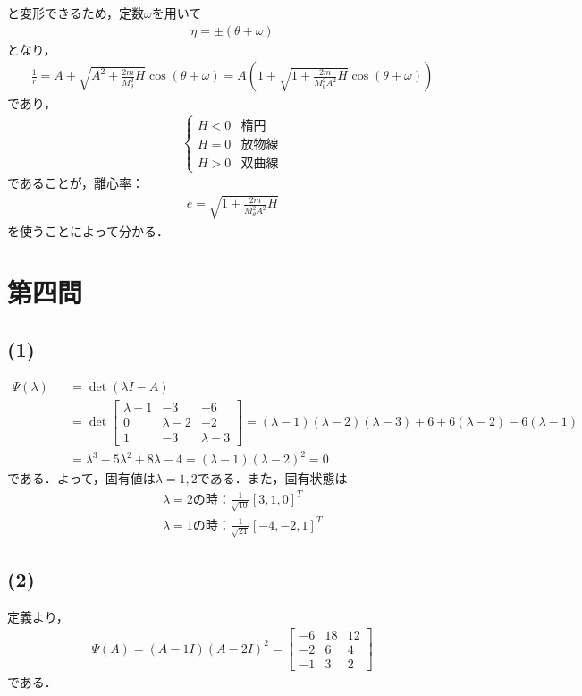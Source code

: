 \documentclass[12pt,dvipdfmx]{jsarticle}
\begin{document}
と変形できるため，定数$\omega$を用いて
\begin{eqnarray}
  \eta = \pm(\theta +\omega)
\end{eqnarray}
となり，
\begin{eqnarray}
  \frac{1}{r} = A + \sqrt{ A^2 + \frac{2m}{M_\theta^2} H }\cos(\theta +\omega) = A\left( 1 + \sqrt{ 1 + \frac{2m}{M_\theta^2 A^2}H }\cos(\theta +\omega) \right)
\end{eqnarray}
であり，
\begin{eqnarray}
  \begin{cases}
    H<0 & 楕円\\
    H=0 & 放物線\\
    H>0 & 双曲線
  \end{cases}
\end{eqnarray}
であることが，離心率：
\begin{eqnarray}
  e = \sqrt{ 1 + \frac{2m}{M_\theta^2 A^2}H }
\end{eqnarray}
を使うことによって分かる．
\section*{\Large{第四問}}
\subsection*{(1)}
\begin{eqnarray}
  \Psi(\lambda) &&= \det\left( \lambda I-A \right)\\
  &&= \det
  \begin{bmatrix}
    \lambda-1 & -3 & -6\\
    0 & \lambda-2 & -2\\
    1 & -3 & \lambda-3
  \end{bmatrix} = (\lambda-1)(\lambda-2)(\lambda-3)+6 + 6(\lambda-2)-6(\lambda-1)\\
  &&= \lambda^3-5\lambda^2+8\lambda-4 = (\lambda-1)(\lambda-2)^2 =0
\end{eqnarray} 
である．よって，固有値は$\lambda=1,2$である．また，固有状態は
\begin{eqnarray}
  &&\lambda=2の時：\frac{1}{\sqrt{10}}[3,1,0]^{T}\\
  &&\lambda=1の時：\frac{1}{\sqrt{21}}[-4,-2,1]^{T}
\end{eqnarray}
\subsection*{(2)}
定義より，
\begin{eqnarray}
  \Psi(A) = (A-1I)(A-2I)^2 = 
  \begin{bmatrix}
    -6 & 18 & 12\\
    -2 & 6 & 4\\
    -1 & 3 & 2
  \end{bmatrix}
\end{eqnarray}
である．
\end{document}
